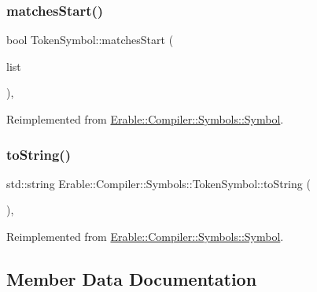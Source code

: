 \subsubsection{\texorpdfstring{matchesStart()}{matchesStart()}}
{\footnotesize\ttfamily bool Token\+Symbol\+::matches\+Start (\begin{DoxyParamCaption}\item[{Data\+::\+Data\+Deque}]{list }\end{DoxyParamCaption})\hspace{0.3cm}{\ttfamily [override]}, {\ttfamily [virtual]}}



Reimplemented from \mbox{\hyperlink{class_erable_1_1_compiler_1_1_symbols_1_1_symbol_a108a4a3e9b9a2785f14ed580e813a52a}{Erable\+::\+Compiler\+::\+Symbols\+::\+Symbol}}.

\mbox{\label{class_erable_1_1_compiler_1_1_symbols_1_1_token_symbol_a0f8499152ff070ae70295c9b25b25b93}} 
\subsubsection{\texorpdfstring{toString()}{toString()}}
{\footnotesize\ttfamily std\+::string Erable\+::\+Compiler\+::\+Symbols\+::\+Token\+Symbol\+::to\+String (\begin{DoxyParamCaption}{ }\end{DoxyParamCaption})\hspace{0.3cm}{\ttfamily [override]}, {\ttfamily [virtual]}}



Reimplemented from \mbox{\hyperlink{class_erable_1_1_compiler_1_1_symbols_1_1_symbol_ac133ad05913f81e836ae2f73815d1432}{Erable\+::\+Compiler\+::\+Symbols\+::\+Symbol}}.



\subsection{Member Data Documentation}
\mbox{\label{class_erable_1_1_compiler_1_1_symbols_1_1_token_symbol_aedef0a5b3fef634067b62c93934ecb08}} 
